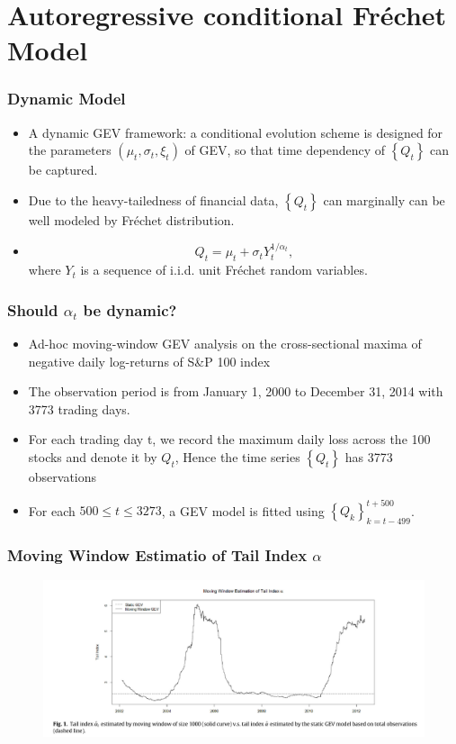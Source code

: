 \documentclass{beamer}
\newcommand{\set}[1]{\left\{#1\right\}}
\begin{document}
\section{Autoregressive conditional Fr\'echet Model}

\begin{frame}
    \frametitle{Dynamic Model}
    \begin{itemize}
        \item     A dynamic GEV framework: a conditional evolution scheme is designed for the parameters $(\mu_t,\sigma_t,\xi_t)$ of GEV, so that time dependency of $\set{Q_t}$ can be captured.
        \bigskip
        \item Due to the heavy-tailedness of financial data, $\set{Q_t}$ can marginally can
        be well modeled by Fr\'echet distribution.
        \item  
        $$
Q_t = \mu_t +\sigma_t Y_t^{1/\alpha_t},
        $$
        where $Y_t$ is a sequence of i.i.d. unit Fr\'echet random variables.
    \end{itemize}
\end{frame}


\begin{frame}
    \frametitle{Should $\alpha_t$ be dynamic?}
\begin{itemize}
    \item Ad-hoc moving-window GEV analysis on the cross-sectional maxima of negative daily log-returns of S\&P 100 index
    \item The observation period is from January 1, 2000 to     December 31, 2014 with 3773 trading days.
    \item For each trading day t, we record the maximum daily loss across the 100 stocks
    and denote it by $Q_t$, Hence the time series $\set{Q_t}$ has 3773 observations
    \item For each $500\le t\le 3273$, a GEV model is fitted using $\set{Q_k}_{k=t-499}^{t+500}$.
\end{itemize}
\end{frame}


\begin{frame}
    \frametitle{Moving Window Estimatio of Tail Index $\alpha$}
    \begin{figure}
        \includegraphics[width=1\textwidth]{fig1.png}   
    \end{figure}
\end{frame}
\end{document}
